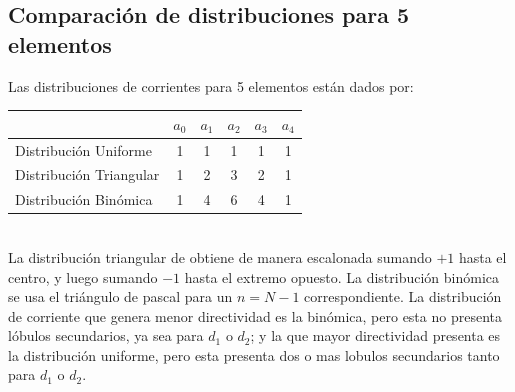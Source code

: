 \documentclass[11pt]{report}
\begin{document}
\subsection{Comparación de distribuciones para 5 elementos}

Las distribuciones de corrientes para 5 elementos están dados por: 

\begin{tabular}{l|c|c|c|c|c}
	& $a_0$ & $a_1$ & $a_2$ & $a_3$ & $a_4$\\ \hline
	Distribución Uniforme 	& 1 & 1 & 1 & 1 & 1 \\
	Distribución Triangular & 1 & 2 & 3 & 2 & 1 \\
	Distribución Binómica 	& 1 & 4 & 6 & 4 & 1 \\
\end{tabular} \\

La distribución triangular de obtiene de manera escalonada sumando $+1$ hasta el centro, y luego sumando $-1$ hasta el extremo opuesto. La distribución binómica se usa el triángulo de pascal para un $n = N - 1$ correspondiente. 
La distribución de corriente que genera menor directividad es la binómica, pero esta no presenta lóbulos secundarios, ya sea para $d_1$ o $d_2$; y la que mayor directividad presenta es la distribución uniforme, pero esta presenta dos o mas lobulos secundarios tanto para $d_1$ o $d_2$.
\end{document}
